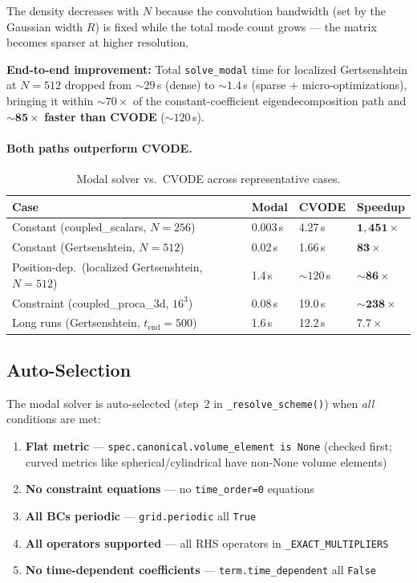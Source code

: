 The density decreases with $N$ because the convolution bandwidth (set by the Gaussian width $R$) is fixed while the total mode count grows --- the matrix becomes sparser at higher resolution.

\textbf{End-to-end improvement:} Total \texttt{solve\_modal} time for localized Gertsenshtein at $N=512$ dropped from ${\sim}29$\,s (dense) to ${\sim}1.4$\,s (sparse + micro-optimizations), bringing it within ${\sim}70\times$ of the constant-coefficient eigendecomposition path and $\mathbf{{\sim}85\times}$ \textbf{faster than CVODE} (${\sim}120$\,s).

\paragraph{Both paths outperform CVODE.}
\label{par:modal-vs-cvode}

\begin{table}[htbp]
\centering
\caption{Modal solver vs.\ CVODE across representative cases.}
\label{tab:modal-vs-cvode}
\begin{tabular}{@{}llll@{}}
\toprule
Case & Modal & CVODE & Speedup \\
\midrule
Constant (coupled\_scalars, $N=256$) & 0.003\,s & 4.27\,s & $\mathbf{1{,}451\times}$ \\
Constant (Gertsenshtein, $N=512$) & 0.02\,s & 1.66\,s & $\mathbf{83\times}$ \\
Position-dep.\ (localized Gertsenshtein, $N=512$) & 1.4\,s & ${\sim}120$\,s & $\mathbf{{\sim}86\times}$ \\
Constraint (coupled\_proca\_3d, $16^3$) & 0.08\,s & 19.0\,s & $\mathbf{{\sim}238\times}$ \\
Long runs (Gertsenshtein, $t_\text{end}=500$) & 1.6\,s & 12.2\,s & $\mathbf{7.7\times}$ \\
\bottomrule
\end{tabular}
\end{table}

\subsection{Auto-Selection}
\label{sec:modal-auto-selection}

The modal solver is auto-selected (step~2 in \texttt{\_resolve\_scheme()}) when \emph{all} conditions are met:

\begin{enumerate}
  \item \textbf{Flat metric} --- \texttt{spec.canonical.volume\_element is None} (checked first; curved metrics like spherical/cylindrical have non-None volume elements)
  \item \textbf{No constraint equations} --- no \texttt{time\_order=0} equations
  \item \textbf{All BCs periodic} --- \texttt{grid.periodic} all \texttt{True}
  \item \textbf{All operators supported} --- all RHS operators in \texttt{\_EXACT\_MULTIPLIERS}
  \item \textbf{No time-dependent coefficients} --- \texttt{term.time\_dependent} all \texttt{False}
\end{enumerate}

